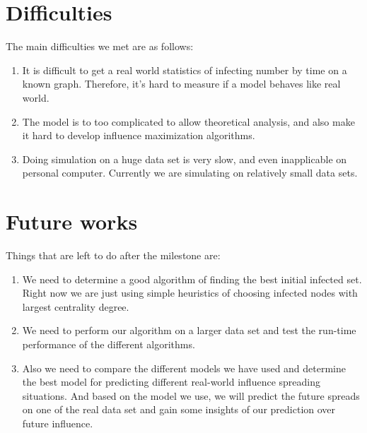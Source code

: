 \documentclass{article}
\begin{document}
\section{Difficulties}
The main difficulties we met are as follows:
\begin{enumerate}
\item It is difficult to get a real world statistics of infecting number by time on a known graph. Therefore, it's hard to measure if a model behaves like real world.
\item The model is to too complicated to allow theoretical analysis, and also make it hard to develop influence maximization algorithms.
\item Doing simulation on a huge data set is very slow, and even inapplicable on personal computer. Currently we are simulating on relatively small data sets.
\end{enumerate}

\section{Future works}
Things that are left to do after the milestone are:
\begin{enumerate}
\item We need to determine a good algorithm of finding the best initial infected set. Right now we are just using simple heuristics of choosing infected nodes with largest centrality degree.
\item We need to perform our algorithm on a larger data set and test the run-time performance of the different algorithms.
\item Also we need to compare the different models we have used and determine the best model for predicting different real-world influence spreading situations. And based on the model we use, we will predict the future spreads on one of the real data set and gain some insights of our prediction over future influence.
\end{enumerate}
\end{document}
